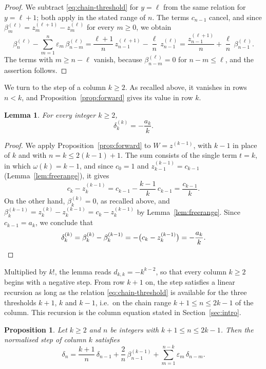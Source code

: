 \documentclass{amsart}
\newtheorem{proposition}[theorem]{Proposition}
\newtheorem{lemma}[theorem]{Lemma}
\theoremstyle{definition}
\theoremstyle{remark}
\numberwithin{equation}{section}
\begin{document}
\begin{proof}
We subtract \eqref{eq:chain-threshold} for $y=\ell$ from the same relation for $y=\ell+1$; both apply in the stated range of $n$. The terms $c_{n-1}$ cancel, and since $\beta^{(\ell)}_m=z^{(\ell+1)}_m-z^{(\ell)}_m$ for every $m\ge 0$, we obtain
\[
\beta^{(\ell)}_n-\sum_{m=1}^{n}\varepsilon_m\,\beta^{(\ell)}_{n-m}
=\frac{\ell+1}{n}\,z^{(\ell+1)}_{n-1}-\frac{\ell}{n}\,z^{(\ell)}_{n-1}
=\frac{z^{(\ell+1)}_{n-1}}{n}+\frac{\ell}{n}\,\beta^{(\ell)}_{n-1}.
\]
The terms with $m\ge n-\ell$ vanish, because $\beta^{(\ell)}_{n-m}=0$ for $n-m\le\ell$, and the assertion follows.
\end{proof}

We turn to the step of a column $k\ge 2$. As recalled above, it vanishes in rows $n<k$, and Proposition~\ref{prop:forward} gives its value in row $k$.

\begin{lemma}\label{lem:initialstep}
For every integer $k\ge 2$,
\[
\delta^{(k)}_k=-\frac{a_k}{k}.
\]
\end{lemma}

\begin{proof}
We apply Proposition~\ref{prop:forward} to $W=z^{(k-1)}$, with $k-1$ in place of $k$ and with $n=k\le 2(k-1)+1$. The sum consists of the single term $t=k$, in which $\omega(k)=k-1$, and since $c_0=1$ and $z^{(k-1)}_{k-1}=c_{k-1}$ (Lemma~\ref{lem:freerange}), it gives
\[
c_k-z^{(k-1)}_k=c_{k-1}-\frac{k-1}{k}\,c_{k-1}=\frac{c_{k-1}}{k}.
\]
On the other hand, $\beta^{(k)}_k=0$, as recalled above, and $\beta^{(k-1)}_k=z^{(k)}_k-z^{(k-1)}_k=c_k-z^{(k-1)}_k$ by Lemma~\ref{lem:freerange}. Since $c_{k-1}=a_k$, we conclude that
\[
\delta^{(k)}_k=\beta^{(k)}_k-\beta^{(k-1)}_k=-\bigl(c_k-z^{(k-1)}_k\bigr)=-\frac{a_k}{k}.\qedhere
\]
\end{proof}

Multiplied by $k!$, the lemma reads $d_{k,k}=-k^{k-2}$, so that every column $k\ge 2$ begins with a negative step. From row $k+1$ on, the step satisfies a linear recursion as long as the relation \eqref{eq:chain-threshold} is available for the three thresholds $k+1$, $k$ and $k-1$, i.e.\ on the chain range $k+1\le n\le 2k-1$ of the column. This recursion is the column equation stated in Section~\ref{sec:intro}.

\begin{proposition}\label{prop:columnequation}
Let $k\ge 2$ and $n$ be integers with $k+1\le n\le 2k-1$. Then the normalised step of column $k$ satisfies
\[
\delta_n=\frac{k+1}{n}\,\delta_{n-1}+\frac{2}{n}\,\beta^{(k-1)}_{n-1}+\sum_{m=1}^{n-k}\varepsilon_m\,\delta_{n-m}.
\]
\end{proposition}
\end{document}
